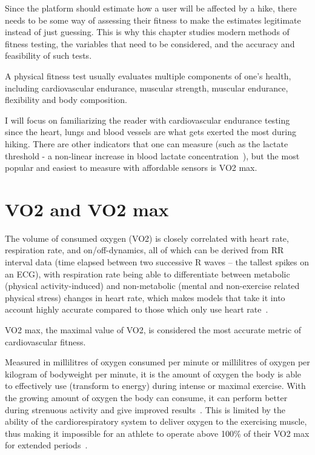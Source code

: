 Since the platform should estimate how a user will be affected by a hike, there needs to be some way of assessing their fitness to make the estimates legitimate instead of just guessing.
This is why this chapter studies modern methods of fitness testing, the variables that need to be considered, and the accuracy and feasibility of such tests.

A physical fitness test usually evaluates multiple components of one's health, including cardiovascular endurance, muscular strength, muscular endurance, flexibility and body composition.

I will focus on familiarizing the reader with cardiovascular endurance testing since the heart, lungs and blood vessels are what gets exerted the most during hiking.
There are other indicators that one can measure (such as the lactate threshold - a non-linear increase in blood lactate concentration~\cite{lactate-threshold}), 
but the most popular and easiest to measure with affordable sensors is VO2 max.

\section{VO2 and VO2 max}

The volume of consumed oxygen (VO2) is closely correlated with heart rate, respiration rate, and on/off-dynamics, all of which can be derived from RR interval data (time elapsed between two successive R waves -- the tallest spikes on an ECG),
with respiration rate being able to differentiate between metabolic (physical activity-induced) and non-metabolic (mental and non-exercise related physical stress) changes in heart rate,
which makes models that take it into account highly accurate compared to those which only use heart rate~\cite{vo2-hr-firstbeat}.

VO2 max, the maximal value of VO2, is considered the most accurate metric of cardiovascular fitness.

Measured in millilitres of oxygen consumed per minute or millilitres of oxygen per kilogram of bodyweight per minute, it is the amount of oxygen the body is able to effectively use (transform to energy) during intense or maximal exercise.
With the growing amount of oxygen the body can consume, it can perform better during strenuous activity and give improved results~\cite{vo2max-definition}.
This is limited by the ability of the cardiorespiratory system to deliver oxygen to the exercising muscle, thus making it impossible for an athlete to operate above 100\% of their VO2 max for extended periods~\cite{vo2max-oxygen-delivery}.

